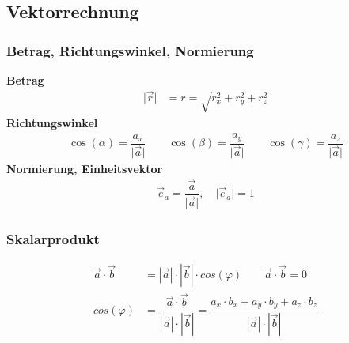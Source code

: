 \subsection{Vektorrechnung}
	\subsubsection{Betrag, Richtungswinkel, Normierung}
		\textbf{Betrag}
		\begin{align*}
			\vert \vec{r}  \vert & = r = \sqrt{r^2_x + r^2_y + r^2_z}
		\end{align*}
		\textbf{Richtungswinkel}
		\begin{align*}
			\cos(\alpha) = \dfrac{a_x}{\vert \vec{a} \vert} \qquad \cos(\beta) = \dfrac{a_y}{\vert \vec{a} \vert} \qquad
			\cos(\gamma) = \dfrac{a_z}{\vert \vec{a} \vert}
		\end{align*}
		\textbf{Normierung, Einheitsvektor}
		\begin{align*}
			\vec{e}_a =  \dfrac{\vec{a}}{\vert \vec{a} \vert}, \quad \vert \vec{e}_a \vert = 1
		\end{align*}

	\subsubsection{Skalarprodukt}
		\begin{align*}
			\vec{a} \cdot \vec{b} & = |\vec{a}| \cdot |\vec{b}| \cdot cos(\varphi) \qquad \vec{a} \cdot \vec{b}  = 0                                                              \\
			cos(\varphi)          & = \dfrac{\vec{a} \cdot \vec{b}}{|\vec{a}| \cdot |\vec{b}|} = \dfrac{a_x \cdot b_x + a_y \cdot b_y + a_z \cdot b_z}{|\vec{a}| \cdot |\vec{b}|}
		\end{align*}

